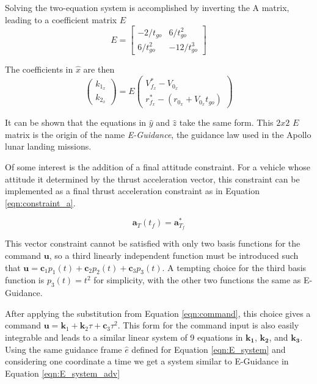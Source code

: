 Solving the two-equation system is accomplished by inverting the A matrix, leading to a coefficient matrix $E$
\begin{equation}
E = 
	\begin{bmatrix}
	-2/t_{go} & 6/t_{go}^2 \\
	6/t_{go}^2 & -12/t_{go}^3
	\end{bmatrix}
\end{equation}

The coefficients in $\hat{x}$ are then
\begin{equation}
\begin{pmatrix}
k_{1_x} \\
k_{2_x}
\end{pmatrix}
= E
\begin{pmatrix}
V_{f_x}^* - V_{0_x} \\ 
r_{f_x}^* - (r_{0_x} + V_{0_x}t_{go}) 
\end{pmatrix}
\end{equation}

It can be shown that the equations in $\hat{y}$ and $\hat{z}$ take the same form. This $2x2$ $E$ matrix is the origin of the name \textit{E-Guidance}, the guidance law used in the Apollo lunar landing missions.

Of some interest is the addition of a final attitude constraint. For a vehicle whose attitude it determined by the thrust acceleration vector, this constraint can be implemented as a final thrust acceleration constraint as in Equation \ref{eqn:constraint_a}.

\begin{equation}
\label{eqn:constraint_a}
\boldsymbol{a}_T(t_f) = \boldsymbol{a}^*_{T_f}
\end{equation}

This vector constraint cannot be satisfied with only two basis functions for the command $\boldsymbol{u}$, so a third linearly independent function must be introduced such that $\boldsymbol{u} = \boldsymbol{c}_1 p_1(t) +\boldsymbol{c}_2 p_2(t) + \boldsymbol{c}_3 p_3(t)$. A tempting choice for the third basis function is $p_3(t) = t^2$ for simplicity, with the other two functions the same as E-Guidance.

After applying the substitution from Equation \ref{eqn:command}, this choice gives a command $\boldsymbol{u} = \boldsymbol{k}_1+\boldsymbol{k}_2 \tau + \boldsymbol{c}_3 \tau^2$. This form for the command input is also easily integrable and leads to a similar linear system of 9 equations in $\boldsymbol{k_1}$, $\boldsymbol{k_2}$, and $\boldsymbol{k_3}$. Using the same guidance frame $\hat{e}$ defined for Equation \ref{eqn:E_system} and considering one coordinate a time we get a system similar to E-Guidance in Equation \ref{eqn:E_system_adv}

